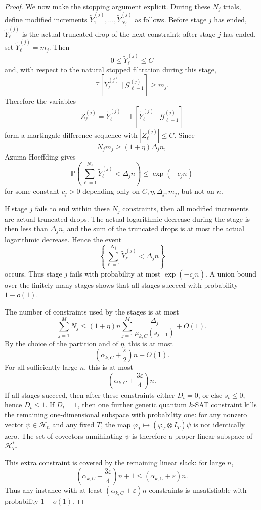 \documentclass[11pt]{article}
\begin{document}
\begin{proof}
		We now make the stopping argument explicit. During these \(N_j\) trials,
		define modified increments \(\widetilde Y_1^{(j)},\ldots,
		\widetilde Y_{N_j}^{(j)}\) as follows. Before stage \(j\) has ended,
		\(\widetilde Y_\ell^{(j)}\) is the actual truncated drop of the next
		constraint; after stage \(j\) has ended, set
		\(\widetilde Y_\ell^{(j)}=m_j\). Then
		\[
		0\le \widetilde Y_\ell^{(j)}\le C
		\]
		and, with respect to the natural stopped filtration during this stage,
		\[
		\mathbb E[\widetilde Y_\ell^{(j)}\mid\mathcal G_{\ell-1}^{(j)}]
		\ge m_j.
		\]
		Therefore the variables
		\[
		Z_\ell^{(j)}=
		\widetilde Y_\ell^{(j)}-
		\mathbb E[\widetilde Y_\ell^{(j)}\mid\mathcal G_{\ell-1}^{(j)}]
		\]
		form a martingale-difference sequence with \(|Z_\ell^{(j)}|\le C\). Since
		\[
		N_jm_j\ge (1+\eta)\Delta_j n,
		\]
		Azuma-Hoeffding gives
		\[
		\mathbb P
		\left(
		\sum_{\ell=1}^{N_j}\widetilde Y_\ell^{(j)}
		<
		\Delta_j n
		\right)
		\le
		\exp(-c_j n)
		\]
		for some constant \(c_j>0\) depending only on \(C,\eta,\Delta_j,m_j\), but
		not on \(n\).
		
		If stage \(j\) fails to end within these \(N_j\) constraints, then all
		modified increments are actual truncated drops. The actual logarithmic
		decrease during the stage is then less than \(\Delta_j n\), and the sum of
		the truncated drops is at most the actual logarithmic decrease. Hence the
		event
		\[
		\left\{\sum_{\ell=1}^{N_j}\widetilde Y_\ell^{(j)}<\Delta_j n\right\}
		\]
		occurs. Thus stage \(j\) fails with probability at most \(\exp(-c_j n)\).
		A union bound over the finitely many stages shows that all stages succeed
		with probability \(1-o(1)\).
		
		The number of constraints used by the stages is at most
		\[
		\sum_{j=1}^M N_j
		\le
		(1+\eta)n
		\sum_{j=1}^M
		\frac{\Delta_j}{\mu_{k,C}(s_{j-1})}
		+O(1).
		\]
		By the choice of the partition and of \(\eta\), this is at most
		\[
		\left(\alpha_{k,C}+\frac{\varepsilon}{2}\right)n+O(1).
		\]
		For all sufficiently large \(n\), this is at most
		\[
		\left(\alpha_{k,C}+\frac{3\varepsilon}{4}\right)n.
		\]
		If all stages succeed, then after these constraints either \(D_t=0\), or
		else \(s_t\le0\), hence \(D_t\le1\). If \(D_t=1\), then one further generic
		quantum \(k\)-SAT constraint kills the remaining one-dimensional subspace
		with probability one: for any nonzero vector \(\psi\in\mathcal H_n\) and
		any fixed \(T\), the map \(\varphi_T\mapsto(\varphi_T\otimes I_{\bar T})\psi\)
		is not identically zero. The set of covectors annihilating \(\psi\) is
		therefore a proper linear subspace of \(\mathcal H_T^*\).
		
		This extra constraint is covered by the remaining linear slack: for large
		\(n\),
		\[
		\left(\alpha_{k,C}+\frac{3\varepsilon}{4}\right)n+1
		\le
		(\alpha_{k,C}+\varepsilon)n.
		\]
		Thus any instance with at least \((\alpha_{k,C}+\varepsilon)n\) constraints
		is unsatisfiable with probability \(1-o(1)\).
	\end{proof}
	
\end{document}
